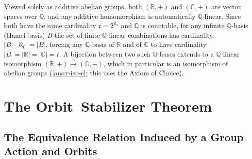 \begin{aiNote}
Viewed solely as additive abelian groups, both $(\mathbb{R}, +)$ and $(\mathbb{C}, +)$ are vector spaces over $\mathbb{Q}$, and any additive homomorphism is automatically $\mathbb{Q}$-linear. Since both have the same cardinality $\mathfrak{c} = 2^{\aleph_0}$ and $\mathbb{Q}$ is countable, for any infinite $\mathbb{Q}$-basis (Hamel basis) $B$ the set of finite $\mathbb{Q}$-linear combinations has cardinality $|B| \cdot \aleph_0 = |B|$, forcing any $\mathbb{Q}$-basis of $\mathbb{R}$ and of $\mathbb{C}$ to have cardinality $|B| = |\mathbb{R}| = |\mathbb{C}| = \mathfrak{c}$. A bijection between two such $\mathbb{Q}$-bases extends to a $\mathbb{Q}$-linear isomorphism $(\mathbb{R}, +) \xrightarrow{\sim} (\mathbb{C}, +)$, which in particular is an isomorphism of abelian groups (\cref{ans:r-iso-c}; this uses the Axiom of Choice).
\end{aiNote}

\section{The Orbit--Stabilizer Theorem}

\subsection{The Equivalence Relation Induced by a Group Action and Orbits}

